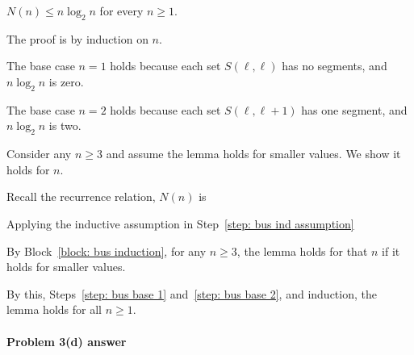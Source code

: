 \begin{lemma}
  $N(n) \le n\log_2 n$ for every $n\ge 1$.
\end{lemma}

\begin{longFormProof}

  \step The proof is by induction on $n$.

  \step\label{step: bus base 1}
  The base case $n=1$ holds because each set $S(\ell, \ell)$ has no segments, and $n\log_2 n$ is zero.
  
  \step\label{step: bus base 2}
  The base case $n=2$ holds because each set $S(\ell, \ell+1)$ has one segment, and $n\log_2 n$ is two.
  
  \begin{block}\label{block: bus induction}

    \step\label{step: bus ind assumption}
    Consider any $n\ge 3$ and assume the lemma holds for smaller values.  We show it holds for $n$.

    \step Recall the recurrence relation,  $N(n)$ is \BLUE{
      \(
      \REPLACEME
      \)
    }

    \step Applying the inductive assumption in Step~\ref{step: bus ind assumption}
    \BLUE{
      \[
        N(n)
        \le
        \REPLACEME
      \]
    }
    
    \step \BLUE{
      \REPLACEME
    }
  \end{block}

  \step By Block~\ref{block: bus induction}, for any $n\ge 3$, the lemma holds for that $n$ if it holds for smaller values.

  \step By this, Steps~\ref{step: bus base 1} and~\ref{step: bus base 2}, and induction, the lemma holds for all $n\ge 1$.

\end{longFormProof}

\continued 

\paragraph{Problem 3(d) answer}

